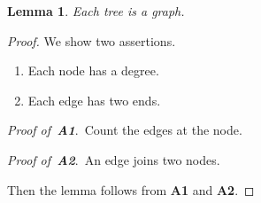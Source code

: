 \documentclass{article}
\newtheorem{lemma}{Lemma}
\begin{document}
\begin{lemma} Each tree is a graph. \end{lemma}
\begin{proof}
We show two assertions.
\begin{enumerate}
\item[{\bf A1.}\,] Each node has a degree.
\item[{\bf A2.}\,] Each edge has two ends.
\end{enumerate}

{\it Proof of \,{\bf A1}}.\, Count the edges at the node.

{\it Proof of \,{\bf A2}}.\, An edge joins two nodes.

Then the lemma follows from {\bf A1} and {\bf A2}.
\end{proof}
\end{document}
